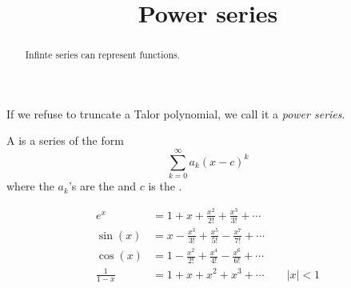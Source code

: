 \documentclass{ximera}
\title[Dig-In:]{Power series}
\begin{document}
\begin{abstract}
  Infinte series can represent functions.
\end{abstract}
\maketitle

If we refuse to truncate a Talor polynomial, we call it a
\textit{power series}.

\begin{definition}
  A  is a series of the form
  \[
  \sum_{k=0}^\infty a_k(x-c)^k
  \]
  where the $a_k$'s are the  and $c$ is the
  .
\end{definition}
\begin{align*}
           e^x &= 1 + x + \frac{x^2}{2!} + \frac{x^3}{3!} + \cdots\\
       \sin(x) &= x - \frac{x^3}{3!} + \frac{x^5}{5!} -\frac{x^7}{7!} + \cdots\\
       \cos(x) &= 1-\frac{x^2}{2!} + \frac{x^4}{4!} -\frac{x^6}{6!} + \cdots\\
 \frac{1}{1-x} &= 1+ x+ x^2 + x^3 + \cdots \qquad |x|< 1
\end{align*}
\end{document}
